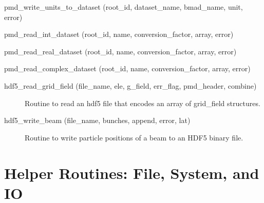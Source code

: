 \begin{description}
\label{r:pmd.write.units.to.dataset}
\item[pmd_write_units_to_dataset (root_id, dataset_name, bmad_name, unit, error)] \Newline 

\label{r:pmd.read.int.dataset}
\item[pmd_read_int_dataset (root_id, name, conversion_factor, array, error)] \Newline 

\label{r:pmd.read.real.dataset}
\item[pmd_read_real_dataset (root_id, name, conversion_factor, array, error)] \Newline 

\label{r:pmd.read.complex.dataset}
\item[pmd_read_complex_dataset (root_id, name, conversion_factor, array, error)] \Newline 

\label{r:hdf5.read.grid.field}
\item[hdf5_read_grid_field (file_name, ele, g_field, err_flag, pmd_header, combine)] \Newline 
Routine to read an hdf5 file that encodes an array of grid_field structures.


\label{r:hdf5.write.beam}
\item[hdf5_write_beam (file_name, bunches, append, error, lat)] \Newline 
Routine to write particle positions of a beam to an HDF5 binary file.

\end{description}

\section{Helper Routines: File, System, and IO}
\label{r:helper.file}

